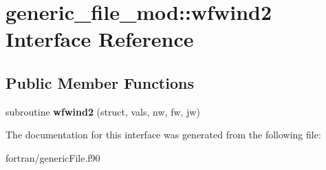 \hypertarget{interfacegeneric__file__mod_1_1wfwind2}{}\section{generic\+\_\+file\+\_\+mod\+:\+:wfwind2 Interface Reference}
\label{interfacegeneric__file__mod_1_1wfwind2}
\subsection*{Public Member Functions}
\begin{DoxyCompactItemize}
\item 
\mbox{\label{interfacegeneric__file__mod_1_1wfwind2_a14e0466cdf029e49599df376b4b94c6f}} 
subroutine {\bfseries wfwind2} (struct, vals, nw, fw, jw)
\end{DoxyCompactItemize}


The documentation for this interface was generated from the following file\+:\begin{DoxyCompactItemize}
\item 
fortran/generic\+File.\+f90\end{DoxyCompactItemize}
